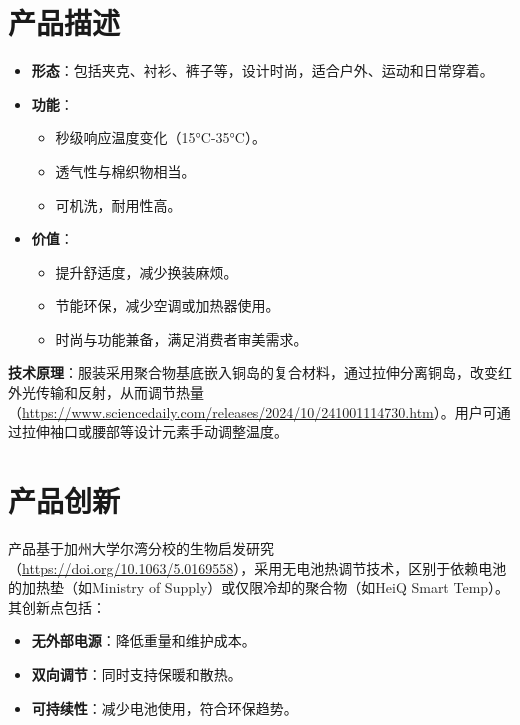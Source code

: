 \documentclass[UTF8]{report}
\theoremstyle{MyLineTheoremStyle} %
\theoremstyle{MyBlockTheoremStyle} %
\theoremstyle{MySubsubsectionStyle} %
\begin{document}
\section{产品描述}
\begin{itemize}
    \item \textbf{形态}：包括夹克、衬衫、裤子等，设计时尚，适合户外、运动和日常穿着。
    \item \textbf{功能}：
        \begin{itemize}
            \item 秒级响应温度变化（15°C-35°C）。
            \item 透气性与棉织物相当。
            \item 可机洗，耐用性高。
        \end{itemize}
    \item \textbf{价值}：
        \begin{itemize}
            \item 提升舒适度，减少换装麻烦。
            \item 节能环保，减少空调或加热器使用。
            \item 时尚与功能兼备，满足消费者审美需求。
        \end{itemize}
\end{itemize}

\textbf{技术原理}：服装采用聚合物基底嵌入铜岛的复合材料，通过拉伸分离铜岛，改变红外光传输和反射，从而调节热量（\url{https://www.sciencedaily.com/releases/2024/10/241001114730.htm}）。用户可通过拉伸袖口或腰部等设计元素手动调整温度。

\section{产品创新}
产品基于加州大学尔湾分校的生物启发研究（\url{https://doi.org/10.1063/5.0169558}），采用无电池热调节技术，区别于依赖电池的加热垫（如Ministry of Supply）或仅限冷却的聚合物（如HeiQ Smart Temp）。其创新点包括：
\begin{itemize}
    \item \textbf{无外部电源}：降低重量和维护成本。
    \item \textbf{双向调节}：同时支持保暖和散热。
    \item \textbf{可持续性}：减少电池使用，符合环保趋势。
\end{itemize}
\end{document}
